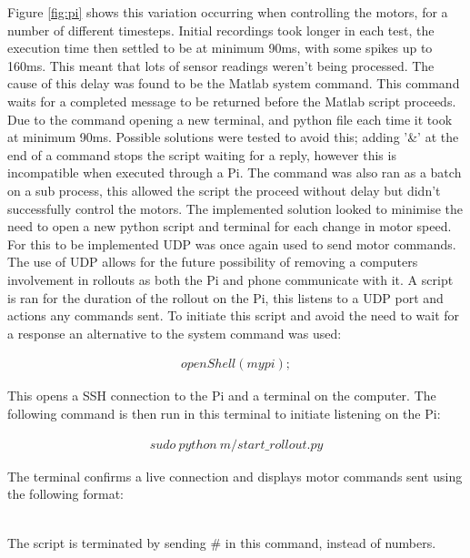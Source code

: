 \documentclass[twoside,twocolumn,12pt]{article}
\begin{document}
\newline
Figure \ref{fig:pi} shows this variation occurring when controlling the motors, for a number of different timesteps. Initial recordings took longer in each test, the execution time then settled to be at minimum 90ms, with some spikes up to 160ms. This meant that lots of sensor readings weren't being processed.
\newline
The cause of this delay was found to be the Matlab system command. This command waits for a completed message to be returned before the Matlab script proceeds. Due to the command opening a new terminal, and python file each time it took at minimum 90ms. Possible solutions were tested to avoid this; adding '\&' at the end of a command stops the script waiting for a reply, however this is incompatible when executed through a Pi. The command was also ran as a batch on a sub process, this allowed the script the proceed without delay but didn't successfully control the motors. 
\newline
The implemented solution looked to minimise the need to open a new python script and terminal for each change in motor speed. For this to be implemented UDP was once again used to send motor commands. The use of UDP allows for the future possibility of removing a computers involvement in rollouts as both the Pi and phone communicate with it. A script is ran for the duration of the rollout on the Pi, this listens to a UDP port and actions any commands sent. To initiate this script and avoid the need to wait for a response an alternative to the system command was used:

\begin{gather}
openShell(mypi); \nonumber
\end{gather}

This opens a SSH connection to the Pi and a terminal on the computer. The following command is then run in this terminal to initiate listening on the Pi:

\begin{gather}
sudo \: python \: m/start\_rollout.py  \nonumber
\end{gather}

The terminal confirms a live connection and displays motor commands sent using the following format:

\begin{gather}
[Flywheel \: Speed, \: Wheel \: Speed] \nonumber
\end{gather}

The script is terminated by sending \# in this command, instead of numbers.
\end{document}
